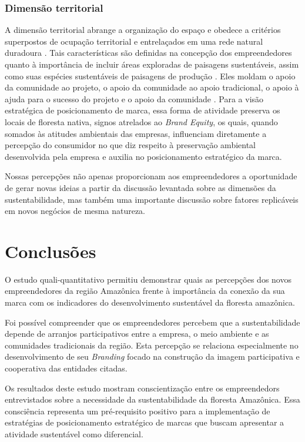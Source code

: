 \subsubsection*{Dimensão territorial}

A dimensão territorial abrange a organização do espaço e obedece a critérios superpostos de ocupação territorial e entrelaçados em uma rede natural duradoura \cite{Sachs1993EstrategiasXXI}. Tais características são definidas na concepção dos empreendedores quanto à importância de incluir áreas exploradas de paisagens sustentáveis, assim como suas espécies sustentáveis de paisagens de produção \cite{Garibaldi2004CulturalRestoration}. Eles moldam o apoio da comunidade ao projeto, o apoio da comunidade ao apoio tradicional, o apoio à ajuda para o sucesso do projeto e o apoio da comunidade \cite{Wehi2017ImportanceRestoration}. Para a visão estratégica de posicionamento de marca, essa forma de atividade preserva os locais de floresta nativa, signos atrelados ao \textit{Brand Equity}, os quais, quando somados às atitudes ambientais das empresas, influenciam diretamente a percepção do consumidor no que diz respeito à preservação ambiental desenvolvida pela empresa e auxilia no posicionamento estratégico da marca. 

Nossas percepções não apenas proporcionam aos empreendedores a oportunidade de gerar novas ideias a partir da discussão levantada sobre as dimensões da sustentabilidade, mas também uma importante discussão sobre fatores replicáveis em novos negócios de mesma natureza. 

\section{Conclusões}

O estudo quali-quantitativo permitiu demonstrar quais as percepções dos novos empreendedores da região Amazônica frente à importância da conexão da sua marca com os indicadores do desenvolvimento sustentável da floresta amazônica.

Foi possível compreender que os empreendedores percebem que a sustentabilidade depende de arranjos participativos entre a empresa, o meio ambiente e as comunidades tradicionais da região. Esta percepção se relaciona especialmente no desenvolvimento de seu \textit{Branding} focado na construção da imagem participativa e cooperativa das entidades citadas. 

Os resultados deste estudo mostram conscientização entre os empreendedors entrevistados sobre a necessidade da sustentabilidade da floresta Amazônica. Essa consciência representa um pré-requisito positivo para a implementação de estratégias de posicionamento estratégico de marcas que buscam apresentar a atividade sustentável como diferencial. 

